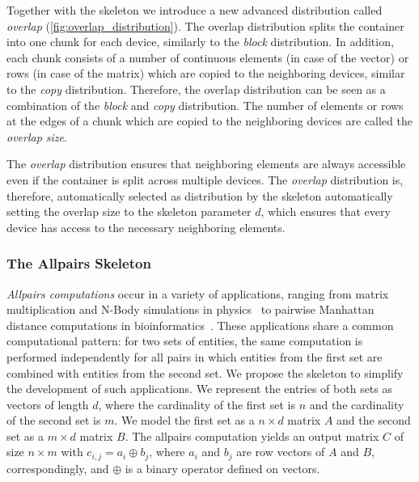 Together with the \stencil skeleton we introduce a new advanced distribution called \emph{overlap} (\autoref{fig:overlap_distribution}).
The overlap distribution splits the container into one chunk for each device, similarly to the \emph{block} distribution.
In addition, each chunk consists of a number of continuous elements (in case of the vector) or rows (in case of the matrix) which are copied to the neighboring devices, similar to the \emph{copy} distribution.
Therefore, the overlap distribution can be seen as a combination of the \emph{block} and \emph{copy} distribution.
The number of elements or rows at the edges of a chunk which are copied to the neighboring devices are called the \emph{overlap size}.

The \emph{overlap} distribution ensures that neighboring elements are always accessible even if the container is split across multiple devices.
The \emph{overlap} distribution is, therefore, automatically selected as distribution by the \stencil skeleton automatically setting the overlap size to the skeleton parameter $d$, which ensures that every device has access to the necessary neighboring elements.





\subsubsection{The Allpairs Skeleton}
\label{sec:allpairs_skeleton}

\emph{Allpairs computations} occur in a variety of applications, ranging from matrix multiplication and N-Body simulations in physics~\cite{AroraShVu2009} to pairwise Manhattan distance computations in bioinformatics~\cite{ChangDeQuRo2009}.
These applications share a common computational pattern:
for two sets of entities, the same computation is performed independently for all pairs in which entities from the first set are combined with entities from the second set.
We propose the \allpairs skeleton to simplify the development of such applications.
We represent the entries of both sets as vectors of length $d$, where the cardinality of the first set is $n$ and the cardinality of the second set is $m$.
We model the first set as a $n\times d$ matrix $A$ and the second set as a $m\times d$ matrix $B$.
The allpairs computation yields an output matrix $C$ of size $n\times m$ with $c_{i, j} = a_i \oplus b_j$, where $a_i$ and $b_j$ are row vectors of $A$ and $B$, correspondingly,
and $\oplus$ is a binary operator defined on vectors.


